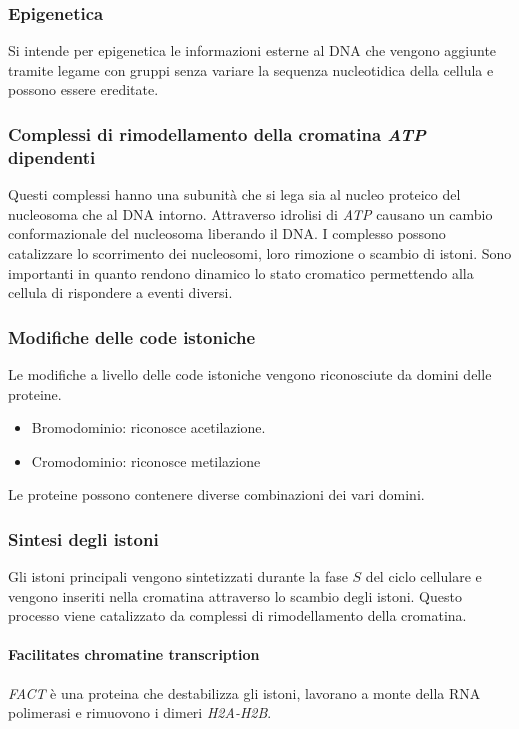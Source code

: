		\subsubsection{Epigenetica}
		Si intende per epigenetica le informazioni esterne al DNA che vengono aggiunte tramite legame con gruppi senza variare la sequenza nucleotidica della cellula e possono essere ereditate.

		\subsubsection{Complessi di rimodellamento della cromatina \emph{ATP} dipendenti}
		Questi complessi hanno una subunit\`a che si lega sia al nucleo proteico del nucleosoma che al DNA intorno.
		Attraverso idrolisi di \emph{ATP} causano un cambio conformazionale del nucleosoma liberando il DNA.
		I complesso possono catalizzare lo scorrimento dei nucleosomi, loro rimozione o scambio di istoni.
		Sono importanti in quanto rendono dinamico lo stato cromatico permettendo alla cellula di rispondere a eventi diversi.

		\subsubsection{Modifiche delle code istoniche}
		Le modifiche a livello delle code istoniche vengono riconosciute da domini delle proteine.
		\begin{multicols}{2}
			\begin{itemize}
				\item Bromodominio: riconosce acetilazione.
				\item Cromodominio: riconosce metilazione
			\end{itemize}
		\end{multicols}
		Le proteine possono contenere diverse combinazioni dei vari domini.

		\subsubsection{Sintesi degli istoni}
		Gli istoni principali vengono sintetizzati durante la fase $S$ del ciclo cellulare e vengono inseriti nella cromatina attraverso lo scambio degli istoni.
		Questo processo viene catalizzato da complessi di rimodellamento della cromatina.

			\paragraph{Facilitates chromatine transcription}
			\emph{FACT} \`e una proteina che destabilizza gli istoni, lavorano a monte della RNA polimerasi e rimuovono i dimeri \emph{H2A-H2B}.

